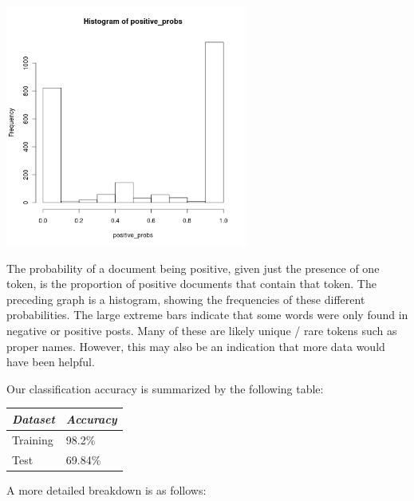 \documentclass[12pt,a4paper]{article}
\begin{document}
\begin{center}
\includegraphics[width=300px]{figs/fig3.png}
\end{center}

The probability of a document being positive, given just the presence of one token, is the proportion of positive documents that contain that token.  The preceding graph is a histogram, showing the frequencies of these different probabilities.  The large extreme bars indicate that some words were only found in negative or positive posts.  Many of these are likely unique / rare tokens such as proper names.  However, this may also be an indication that more data would have been helpful.

Our classification accuracy is summarized by the following table:

\begin{tabular}{|l|l|}
\hline
\emph{Dataset} & \emph{Accuracy} \\ \hline
Training & 98.2\% \\ \hline
Test & 69.84\% \\ \hline
\end{tabular}

A more detailed breakdown is as follows:
\end{document}
